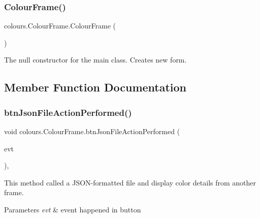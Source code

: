 \subsubsection{\texorpdfstring{Colour\+Frame()}{ColourFrame()}}
{\footnotesize\ttfamily colours.\+Colour\+Frame.\+Colour\+Frame (\begin{DoxyParamCaption}{ }\end{DoxyParamCaption})\hspace{0.3cm}{\ttfamily [inline]}}

The null constructor for the main class. Creates new form. 

\subsection{Member Function Documentation}
\mbox{\label{classcolours_1_1_colour_frame_ab959355834a40b99a18e05e5121417c5}} 
\subsubsection{\texorpdfstring{btn\+Json\+File\+Action\+Performed()}{btnJsonFileActionPerformed()}}
{\footnotesize\ttfamily void colours.\+Colour\+Frame.\+btn\+Json\+File\+Action\+Performed (\begin{DoxyParamCaption}\item[{java.\+awt.\+event.\+Action\+Event}]{evt }\end{DoxyParamCaption})\hspace{0.3cm}{\ttfamily [inline]}, {\ttfamily [private]}}

This method called a J\+S\+O\+N-\/formatted file and display color details from another frame. 
\begin{DoxyParams}{Parameters}
{\em evt} & event happened in button \\
\hline
\end{DoxyParams}
\mbox{\label{classcolours_1_1_colour_frame_ad1dd5e41e9cc42f135ff3c1b343ff761}} 
